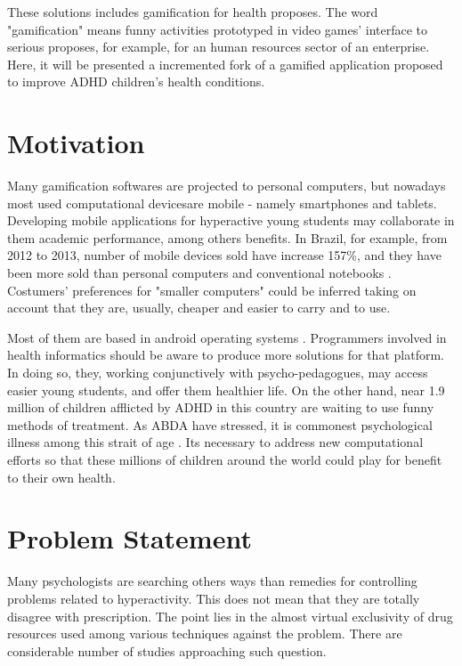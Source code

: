 These solutions includes gamification for health proposes. The word "gamification" means funny activities prototyped in video games' interface to serious proposes, for example, for an human resources sector of an enterprise. Here, it will be presented a incremented fork of a gamified application proposed to improve ADHD children's health conditions. 
  
 
\section{Motivation}
\label{sc:motivation}

Many gamification softwares are projected to personal computers, but nowadays most used computational devicesare mobile - namely smartphones and tablets. Developing mobile applications for hyperactive young students may collaborate in them academic performance, among others benefits. In Brazil, for example, from 2012 to 2013, number of mobile devices sold have increase 157\%, and they have been more sold than personal computers and conventional notebooks \citep{Villa}. Costumers' preferences for "smaller computers" could be inferred taking on account that they are, usually, cheaper and easier to carry and to use.  

Most of them are based in android operating systems . Programmers involved in health informatics should be aware to produce more solutions for that platform. In doing so, they, working conjunctively with psycho-pedagogues, may access easier young students, and offer them healthier life. On the other hand, near 1.9 million of children afflicted by ADHD in this country are waiting to use funny methods of treatment. As ABDA have stressed, it is commonest psychological illness among this strait of age  \citep{Villa}. Its necessary to address new computational efforts so that these millions of children around the world could play for benefit to their own health.


\section{Problem Statement}
\label{sc:problem} 

Many psychologists are searching others ways than remedies for controlling problems related to hyperactivity. This does not mean that they are totally disagree with prescription. The point lies in the almost virtual exclusivity of drug resources used among various techniques against the problem. There are considerable number of studies approaching such question.

